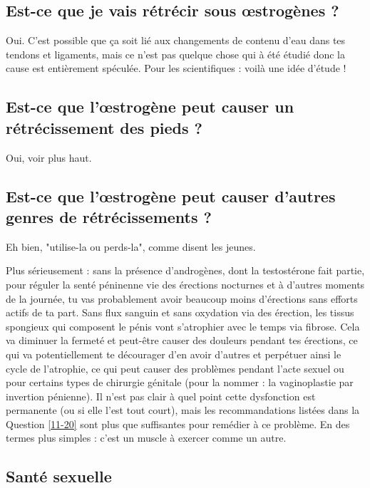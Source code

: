 \documentclass{article}
\begin{document}
\subsection{Est-ce que je vais rétrécir sous œstrogènes ?}

Oui. C'est possible que ça soit lié aux changements de contenu d'eau dans tes tendons et ligaments, mais ce n'est pas quelque chose qui à été étudié donc la cause est entièrement spéculée. Pour les scientifiques : voilà une idée d'étude ! 

\subsection{Est-ce que l'œstrogène peut causer un rétrécissement des pieds ?}

Oui, voir plus haut.

\subsection{Est-ce que l'œstrogène peut causer d'autres genres de rétrécissements ?}\label{11-19}

Eh bien, "utilise-la ou perds-la", comme disent les jeunes.

Plus sérieusement : sans la présence d'androgènes, dont la testostérone fait partie, pour réguler la senté péninenne vie des érections nocturnes et à d'autres moments de la journée, tu vas probablement avoir beaucoup moins d'érections sans efforts actifs de ta part. Sans flux sanguin et sans oxydation via des érection, les tissus spongieux qui composent le pénis vont s'atrophier avec le temps via fibrose. Cela va diminuer la fermeté et peut-être causer des douleurs pendant tes érections, ce qui va potentiellement te décourager d'en avoir d'autres et perpétuer ainsi le cycle de l'atrophie, ce qui peut causer des problèmes pendant l'acte sexuel ou pour certains types de chirurgie génitale (pour la nommer : la vaginoplastie par invertion pénienne). Il n'est pas clair à quel point cette dysfonction est permanente (ou si elle l'est tout court), mais les recommandations listées dans la Question \ref{11-20} sont plus que suffisantes pour remédier à ce problème. En des termes plus simples : c'est un muscle à exercer comme un autre.

\subsection*{Santé sexuelle}
\end{document}
